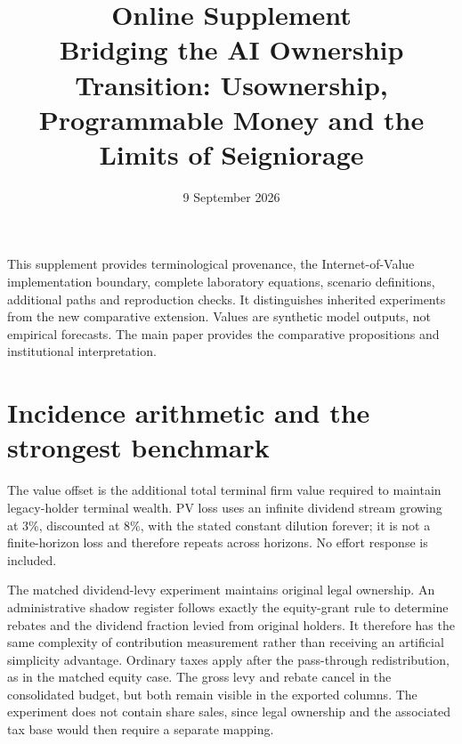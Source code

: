 \documentclass[11pt,a4paper]{article}
\title{Online Supplement\\\large Bridging the AI Ownership Transition: Usownership, Programmable Money and the Limits of Seigniorage}
\author{}\date{9 September 2026}
\begin{document}
\maketitle
This supplement provides terminological provenance, the Internet-of-Value implementation boundary, complete laboratory equations, scenario definitions, additional paths and reproduction checks. It distinguishes inherited experiments from the new comparative extension. Values are synthetic model outputs, not empirical forecasts. The main paper provides the comparative propositions and institutional interpretation.

\section{Incidence arithmetic and the strongest benchmark}
\begin{table}[htbp]\centering\small
\caption{Constant equity issuance: ownership, terminal compensation and legacy present value}

\par\smallskip\footnotesize The value offset is the additional total terminal firm value required to maintain legacy-holder terminal wealth. PV loss uses an infinite dividend stream growing at 3\%, discounted at 8\%, with the stated constant dilution forever; it is not a finite-horizon loss and therefore repeats across horizons. No effort response is included.
\end{table}
The matched dividend-levy experiment maintains original legal ownership. An administrative shadow register follows exactly the equity-grant rule to determine rebates and the dividend fraction levied from original holders. It therefore has the same complexity of contribution measurement rather than receiving an artificial simplicity advantage. Ordinary taxes apply after the pass-through redistribution, as in the matched equity case. The gross levy and rebate cancel in the consolidated budget, but both remain visible in the exported columns. The experiment does not contain share sales, since legal ownership and the associated tax base would then require a separate mapping.
\end{document}
